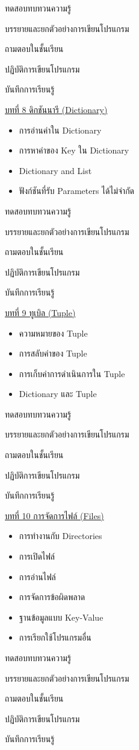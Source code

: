 {
\item ทดสอบทบทวนความรู้
\item  บรรยายและยกตัวอย่างการเขียนโปรแกรม
\item  ถามตอบในชั้นเรียน
\item  ปฏิบัติการเขียนโปรแกรม
\item  บันทึกการเรียนรู้
}
{
\underline{บทที่ 8 ดิกชันนารี (Dictionary)}
\begin{itemize}
\item การอ่านค่าใน Dictionary
\item การหาค่าของ Key ใน Dictionary
\item Dictionary and List
\item ฟังก์ชันที่รับ Parameters ได้ไม่จำกัด
\end{itemize}
}
{
\item ทดสอบทบทวนความรู้
\item  บรรยายและยกตัวอย่างการเขียนโปรแกรม
\item  ถามตอบในชั้นเรียน
\item  ปฏิบัติการเขียนโปรแกรม
\item  บันทึกการเรียนรู้
}
{
\underline{บทที่ 9 ทูเบิล (Tuple)}
\begin{itemize}
\item ความหมายของ Tuple
\item การสลับค่าของ Tuple
\item การเก็บค่าการดำเนินการใน Tuple
\item Dictionary และ Tuple
\end{itemize}
}
{
\item ทดสอบทบทวนความรู้
\item  บรรยายและยกตัวอย่างการเขียนโปรแกรม
\item  ถามตอบในชั้นเรียน
\item  ปฏิบัติการเขียนโปรแกรม
\item  บันทึกการเรียนรู้
}
{
\underline{บทที่ 10 การจัดการไฟล์ (Files)}
\begin{itemize}
\item การทำงานกับ Directories
\item การเปิดไฟล์
\item การอ่านไฟล์
\item การจัดการข้อผิดพลาด
\item ฐานข้อมูลแบบ Key-Value
\item การเรียกใช้โปรแกรมอื่น
\end{itemize}
}
{
\item ทดสอบทบทวนความรู้
\item  บรรยายและยกตัวอย่างการเขียนโปรแกรม
\item  ถามตอบในชั้นเรียน
\item  ปฏิบัติการเขียนโปรแกรม
\item  บันทึกการเรียนรู้
}
